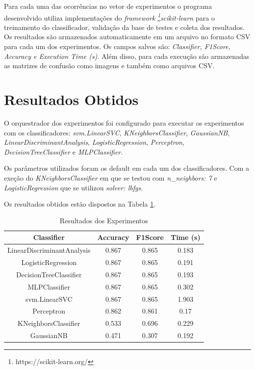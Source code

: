 \documentclass[conference]{IEEEtran}
\begin{document}
Para cada uma das ocorrências no vetor de experimentos o programa desenvolvido utiliza implementações do \textit{framework} \textit{\footnote{https://scikit-learn.org/}scikit-learn} para o treinamento do classificador, validação da base de testes e coleta dos resultados. Os resultados são armazenados automaticamente em um arquivo no formato CSV para cada um dos experimentos. Os campos salvos são: \textit{Classifier, F1Score, Accuracy e Execution Time (s)}. Além disso, para cada execução são armazenadas as matrizes de confusão como imagens e também como arquivos CSV.

\section{Resultados Obtidos}

O orquestrador dos experimentos foi configurado para executar os experimentos com os classificadores: \textit{svm.LinearSVC}, \textit{KNeighborsClassifier}, \textit{GaussianNB}, \textit{LinearDiscriminantAnalysis}, \textit{LogisticRegression}, \textit{Perceptron}, \textit{DecisionTreeClassifier} e \textit{MLPClassifier}.

Os parâmetros utilizados foram os default em cada um dos classificadores. Com a exeção do \textit{KNeighborsClassifier} em que se testou com \textit{n\_neighbors: 7} e \textit{LogisticRegression} que se utilizou \textit{solver: lbfgs}.

Os resultados obtidos estão dispostos na Tabela \ref{tab:resultados_experimentos}.

\begin{table}[!htb]
    \centering
    \begin{tabular}{|c|c|c|c|}
        \hline
        \textbf{Classifier}        & \textbf{Accuracy} & \textbf{F1Score} & \textbf{Time (s)} \\ \hline
        LinearDiscriminantAnalysis & 0.867             & 0.865            & 0.183             \\ \hline
        LogisticRegression         & 0.867             & 0.865            & 0.191             \\ \hline
        DecisionTreeClassifier     & 0.867             & 0.865            & 0.193             \\ \hline
        MLPClassifier              & 0.867             & 0.865            & 0.302             \\ \hline
        svm.LinearSVC              & 0.867             & 0.865            & 1.903             \\ \hline
        Perceptron                 & 0.862             & 0.861            & 0.17              \\ \hline
        KNeighborsClassifier       & 0.533             & 0.696            & 0.229             \\ \hline
        GaussianNB                 & 0.471             & 0.307            & 0.192             \\ \hline
    \end{tabular}
    \vspace{0.2cm}
    \caption{Resultados dos Experimentos}
    \label{tab:resultados_experimentos}
\end{table}
\end{document}
